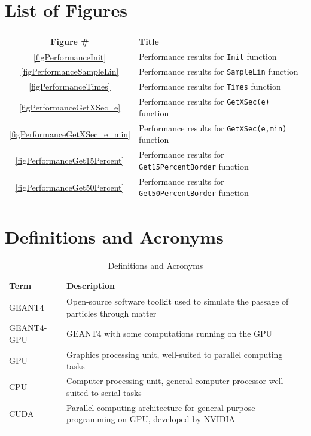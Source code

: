 \documentclass[12pt]{article}
\begin{document}
\section*{List of Figures}
\begin{center}
\begin{tabular}{cl}
\toprule
\bf Figure \# & \bf Title\\\midrule
\ref{figPerformanceInit} & Performance results for \texttt{Init} function\\
\ref{figPerformanceSampleLin} & Performance results for \texttt{SampleLin} function\\
\ref{figPerformanceTimes} & Performance results for \texttt{Times} function\\
\ref{figPerformanceGetXSec_e} & Performance results for \texttt{GetXSec(e)} function\\
\ref{figPerformanceGetXSec_e_min} & Performance results for \texttt{GetXSec(e,min)} function\\
\ref{figPerformanceGet15Percent} & Performance results for \texttt{Get15PercentBorder} function\\
\ref{figPerformanceGet50Percent} & Performance results for \texttt{Get50PercentBorder} function\\
\bottomrule
\end{tabular}
\end{center}

\section*{Definitions and Acronyms} %
\begin{table}[h]
\centering
\caption{Definitions and Acronyms}\label{Table_DefAndAcro}
\begin{tabularx}{\textwidth}{lX}
\toprule
\bf Term & \bf Description\\\midrule
GEANT4 & Open-source software toolkit used to simulate the passage of particles through matter\\
GEANT4-GPU & GEANT4 with some computations running on the GPU\\
GPU & Graphics processing unit, well-suited to parallel computing tasks\\
CPU & Computer processing unit, general computer processor well-suited to serial tasks\\
CUDA & Parallel computing architecture for general purpose programming on GPU, developed by NVIDIA\\
\Xhline{2\arrayrulewidth}
\end{tabularx}
\end{table}
\end{document}
